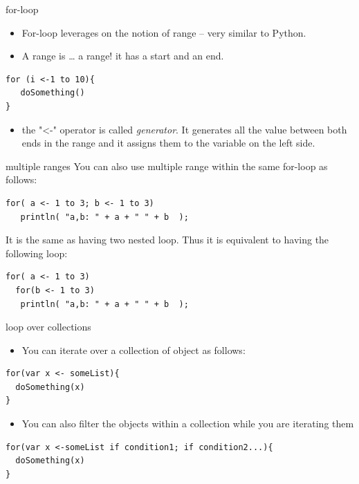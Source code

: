 \documentclass[presentation, aspectratio=169]{beamer}
\begin{document}
\begin{frame}[label={sec:org02d19e0},fragile]{for-loop}
 \begin{itemize}
\item For-loop leverages on the notion of range -- very similar to Python.

\item A range is \ldots{} a range! it has a start and an end.
\end{itemize}
\begin{verbatim}
for (i <-1 to 10){
   doSomething()
}
\end{verbatim}
\begin{itemize}
\item the "<-" operator is called \emph{generator}. It generates all the value between both ends in the range
and it assigns them to the variable on the left side.
\end{itemize}
\end{frame}

\begin{frame}[label={sec:org2e637cd},fragile]{multiple ranges}
 You can also use multiple range within the same for-loop as follows:
\begin{verbatim}
for( a <- 1 to 3; b <- 1 to 3)
   println( "a,b: " + a + " " + b  );

\end{verbatim}
It is the same as having two nested loop. 
Thus it is equivalent to having the following loop:
\begin{verbatim}
for( a <- 1 to 3)
  for(b <- 1 to 3)
   println( "a,b: " + a + " " + b  );
\end{verbatim}
\end{frame}

\begin{frame}[label={sec:org7dc8089},fragile]{loop over collections}
 \begin{itemize}
\item You can iterate over a collection of object as follows:
\end{itemize}
\begin{verbatim}
for(var x <- someList){
  doSomething(x)
}
\end{verbatim}
\begin{itemize}
\item You can also filter the objects within a collection while you are iterating them
\end{itemize}
\begin{verbatim}
for(var x <-someList if condition1; if condition2...){
  doSomething(x)
}
\end{verbatim}
\end{frame}
\end{document}
